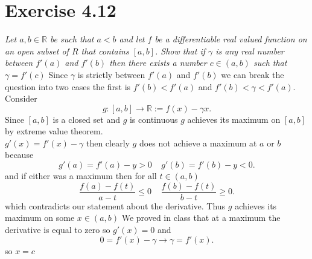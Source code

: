 \documentclass{amsart}
\begin{document}
    \section{Exercise 4.12}
    \emph{
        Let $a,b \in \mathbb{R}  $ be such that $a < b$ and let $f$ be a differentiable real valued
        function on an open subset of $R$  that contains $[a,b]$. Show that if $\gamma$ is any real
        number between $f'(a)$ and $f'(b)$ then there exists a number $c \in (a,b)$ such that
        $\gamma = f'(c)$
    }
    Since $\gamma$ is strictly between $f'(a)$ and $f'(b)$ we can break the question into two cases
    the first is $f'(b) < f'(a)$ and $f'(b) < \gamma < f'(a)$. Consider 
    \[
    g: [a,b] \rightarrow \mathbb{R} := f(x) - \gamma x
    .\]
    Since $[a,b]$ is a closed set and $g$ is continuous $g$ achieves its maximum on $[a,b]$ by extreme value theorem.\\
    $g'(x) = f'(x) - \gamma$ then clearly  $g$ does not achieve a maximum at  $a$ or  $b$ because 
    \[
    g'(a) = f'(a) - y > 0 \; \; \; \; g'(b) = f'(b) - y < 0
    .\] 
    and if either was a maximum then
    for all $t \in (a,b)$
    \[
        \frac{f(a)-f(t)}{a-t} \le 0 \; \; \; \; \frac{f(b)-f(t)}{b-t} \ge 0
    .\] 
    which contradicts our statement about the derivative.
    Thus $g$ achieves its maximum on some $x \in (a,b)$
    We proved in class that at a maximum the derivative is equal to zero so $g'(x) = 0$ and
     \[
    0 = f'(x) - \gamma \rightarrow \gamma = f'(x)
    .\] 
    so $x = c$
\end{document}
